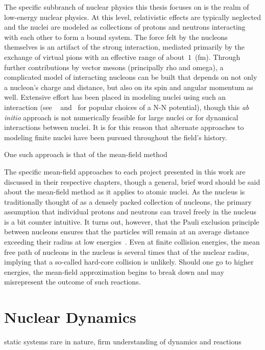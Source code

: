 The specific subbranch of nuclear physics this thesis focuses on is the realm of low-energy nuclear physics.
At this level, relativistic effects are typically neglected and the nuclei are modeled as collections of protons and neutrons interacting with each other to form a bound system.
The force felt by the nucleons themselves is an artifact of the strong interaction, mediated primarily by the exchange of virtual pions with an effective range of about~$1$~(fm).
Through further contributions by vector mesons (principally rho and omega), a complicated model of interacting nucleons can be built that depends on not only a nucleon's charge and distance, but also on its spin and angular momentum as well.
Extensive effort has been placed in modeling nuclei using such an interaction (see ~\citep{wiringa1995} and~\citep{reid1968} for popular choices of a N-N potential), though this \textit{ab initio} approach is not numerically feasible for large nuclei or for dynamical interactions between nuclei.
It is for this reason that alternate approaches to modeling finite nuclei have been pursued throughout the field's history.

One such approach is that of the mean-field method \citep{hartree1928,fock1930,dirac1930,kohn1965}

The specific mean-field approaches to each project presented in this work are discussed in their respective chapters, though a general, brief word should be said about the mean-field method as it applies to atomic nuclei.
As the nucleus is traditionally thought of as a densely packed collection of nucleons, the primary assumption that individual protons and neutrons can travel freely in the nucleus is a bit counter intuitive.
It turns out, however, that the Pauli exclusion principle between nucleons ensures that the particles will remain at an average distance exceeding their radius at low energies~\citep{ring1980}.
Even at finite collision energies, the mean free path of nucleons in the nucleus is several times that of the nuclear radius, implying that a so-called hard-core collision is unlikely.
Should one go to higher energies, the mean-field approximation begins to break down and may misrepresent the outcome of such reactions.

\section{Nuclear Dynamics}

static systems rare in nature, firm understanding of dynamics and reactions

